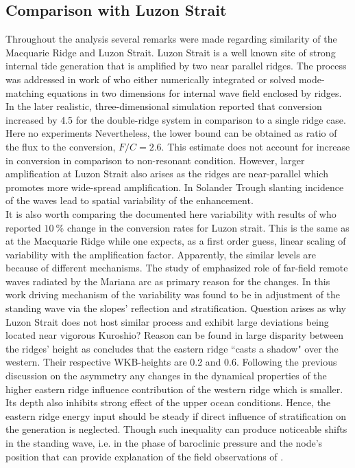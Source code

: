\documentclass[12pt]{article}
\begin{document}
\subsection{Comparison with Luzon Strait}
\label{C3.sec:disc_luzon}
Throughout the analysis several remarks were made regarding similarity of the Macquarie Ridge and 
Luzon Strait. Luzon Strait is a well known site of strong internal tide generation that is 
amplified by two near parallel ridges. The process was addressed in work of 
\citep{buijsman2012double, klymak2013parameterizing} who either numerically integrated or solved 
mode-matching equations in two dimensions for internal wave field enclosed by ridges. In the later 
realistic, three-dimensional simulation \citep{buijsman2014three} reported that conversion 
increased by 4.5 for the double-ridge system in comparison to a single ridge case. Here no 
experiments 
Nevertheless, the lower bound can be obtained as ratio of the flux to the conversion, $F/C = 2.6$. 
This estimate does not account for increase in conversion in comparison to non-resonant condition. 
However, larger amplification at Luzon Strait also arises as the ridges are near-parallel which 
promotes more wide-spread amplification. In Solander Trough slanting incidence of the waves 
 lead to spatial variability of the enhancement.\\

It is also worth comparing the documented here variability with results of \cite{kerry2014impact} 
who reported $10~\%$ change in the conversion rates for Luzon strait. This is the same as at the 
Macquarie Ridge while one 
expects, as a first order guess, linear scaling of variability with the amplification factor. 
Apparently, the similar levels are because of different mechanisms. The study of 
\cite{kerry2014impact} 
emphasized role of far-field remote waves radiated by the Mariana arc as primary reason for the 
changes. In this work driving mechanism of the variability was found to be in 
adjustment of the standing wave via the slopes' reflection and stratification. Question arises as 
why Luzon Strait 
does not host similar process and exhibit large deviations being located near vigorous Kuroshio? 
Reason can be 
found in large 
disparity 
between the ridges' height as \cite{klymak2013parameterizing} concludes that the eastern ridge ``casts 
a shadow" over the western. Their respective WKB-heights are 0.2 and 0.6. Following the previous 
discussion on the asymmetry any changes in the dynamical properties of the higher eastern ridge 
influence contribution of the western ridge which is smaller. Its depth also 
inhibits strong effect of the upper ocean conditions. Hence, the eastern 
ridge energy input should be steady if direct influence of stratification on the generation is 
neglected. Though such inequality can produce noticeable shifts in the standing wave, i.e. in the 
phase of baroclinic pressure and the node's position that can provide explanation of the field 
observations of \cite{buijsman2014three}.
\end{document}
